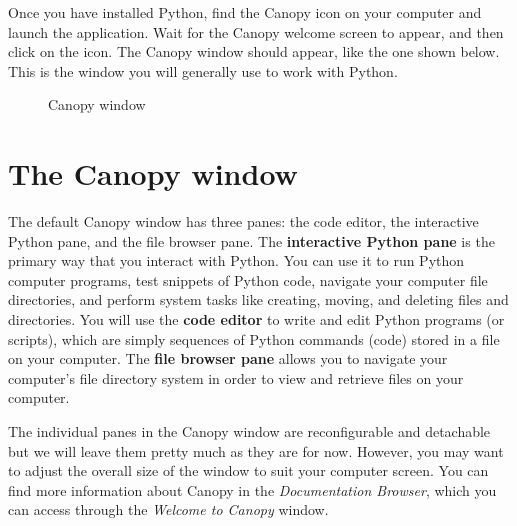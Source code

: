 \documentclass[letterpaper,10pt,english]{sphinxmanual}
\begin{document}
Once you have installed Python, find the Canopy icon on your computer and launch the application.  Wait for the Canopy welcome screen to appear, and then click on the  icon.  The Canopy window should appear, like the one shown below.  This is the window you will generally use to work with Python.
\begin{figure}[htbp]
\centering
\capstart

\caption{Canopy window}\label{chap2/chap2_basics:fig-canopywindow}\end{figure}


\section{The Canopy window}
\label{chap2/chap2_basics:the-canopy-window}
The default Canopy window has three panes: the code editor, the interactive Python pane, and the file browser pane.  The \textbf{interactive Python pane} is the primary way that you interact with Python.  You can use it to run Python computer programs, test snippets of Python code, navigate your computer file directories, and perform system tasks like creating, moving, and deleting files and directories.  You will use the \textbf{code editor} to write and edit Python programs (or scripts), which are simply sequences of Python commands (code) stored in a file on your computer.  The \textbf{file browser pane} allows you to navigate your computer's file directory system in order to view and retrieve files on your computer.

The individual panes in the Canopy window are reconfigurable and detachable but we will leave them pretty much as they are for now.  However, you may want to adjust the overall size of the window to suit your computer screen.  You can find more information about Canopy in the \emph{Documentation Browser}, which you can access through the \emph{Welcome to Canopy} window.
\end{document}
